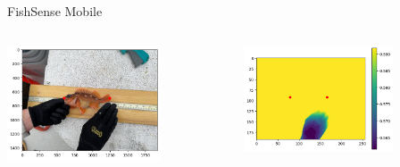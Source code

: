 \begin{frame}{FishSense Mobile}
     \begin{columns}
         \begin{column}{0.5\textwidth}
             \centering
             \includegraphics[height=0.7\textheight,width=0.7\textwidth,keepaspectratio]{images/fs_rgb_1.png}
         \end{column}
         \begin{column}{0.5\textwidth}
             \centering
             \includegraphics[height=0.7\textheight,width=0.7\textwidth,keepaspectratio]{images/fs_depth_1.png}
         \end{column}
     \end{columns}
\end{frame}

